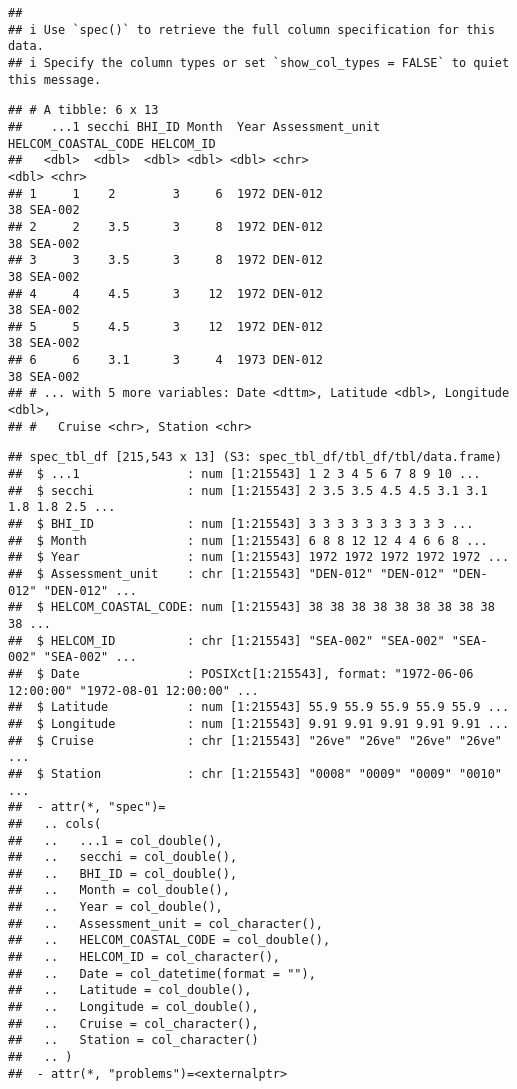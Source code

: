 \documentclass[
]{article}
\begin{document}
\begin{verbatim}
## 
## i Use `spec()` to retrieve the full column specification for this data.
## i Specify the column types or set `show_col_types = FALSE` to quiet this message.
\end{verbatim}

\begin{verbatim}
## # A tibble: 6 x 13
##    ...1 secchi BHI_ID Month  Year Assessment_unit HELCOM_COASTAL_CODE HELCOM_ID
##   <dbl>  <dbl>  <dbl> <dbl> <dbl> <chr>                         <dbl> <chr>    
## 1     1    2        3     6  1972 DEN-012                          38 SEA-002  
## 2     2    3.5      3     8  1972 DEN-012                          38 SEA-002  
## 3     3    3.5      3     8  1972 DEN-012                          38 SEA-002  
## 4     4    4.5      3    12  1972 DEN-012                          38 SEA-002  
## 5     5    4.5      3    12  1972 DEN-012                          38 SEA-002  
## 6     6    3.1      3     4  1973 DEN-012                          38 SEA-002  
## # ... with 5 more variables: Date <dttm>, Latitude <dbl>, Longitude <dbl>,
## #   Cruise <chr>, Station <chr>
\end{verbatim}

\begin{verbatim}
## spec_tbl_df [215,543 x 13] (S3: spec_tbl_df/tbl_df/tbl/data.frame)
##  $ ...1               : num [1:215543] 1 2 3 4 5 6 7 8 9 10 ...
##  $ secchi             : num [1:215543] 2 3.5 3.5 4.5 4.5 3.1 3.1 1.8 1.8 2.5 ...
##  $ BHI_ID             : num [1:215543] 3 3 3 3 3 3 3 3 3 3 ...
##  $ Month              : num [1:215543] 6 8 8 12 12 4 4 6 6 8 ...
##  $ Year               : num [1:215543] 1972 1972 1972 1972 1972 ...
##  $ Assessment_unit    : chr [1:215543] "DEN-012" "DEN-012" "DEN-012" "DEN-012" ...
##  $ HELCOM_COASTAL_CODE: num [1:215543] 38 38 38 38 38 38 38 38 38 38 ...
##  $ HELCOM_ID          : chr [1:215543] "SEA-002" "SEA-002" "SEA-002" "SEA-002" ...
##  $ Date               : POSIXct[1:215543], format: "1972-06-06 12:00:00" "1972-08-01 12:00:00" ...
##  $ Latitude           : num [1:215543] 55.9 55.9 55.9 55.9 55.9 ...
##  $ Longitude          : num [1:215543] 9.91 9.91 9.91 9.91 9.91 ...
##  $ Cruise             : chr [1:215543] "26ve" "26ve" "26ve" "26ve" ...
##  $ Station            : chr [1:215543] "0008" "0009" "0009" "0010" ...
##  - attr(*, "spec")=
##   .. cols(
##   ..   ...1 = col_double(),
##   ..   secchi = col_double(),
##   ..   BHI_ID = col_double(),
##   ..   Month = col_double(),
##   ..   Year = col_double(),
##   ..   Assessment_unit = col_character(),
##   ..   HELCOM_COASTAL_CODE = col_double(),
##   ..   HELCOM_ID = col_character(),
##   ..   Date = col_datetime(format = ""),
##   ..   Latitude = col_double(),
##   ..   Longitude = col_double(),
##   ..   Cruise = col_character(),
##   ..   Station = col_character()
##   .. )
##  - attr(*, "problems")=<externalptr>
\end{verbatim}
\end{document}
